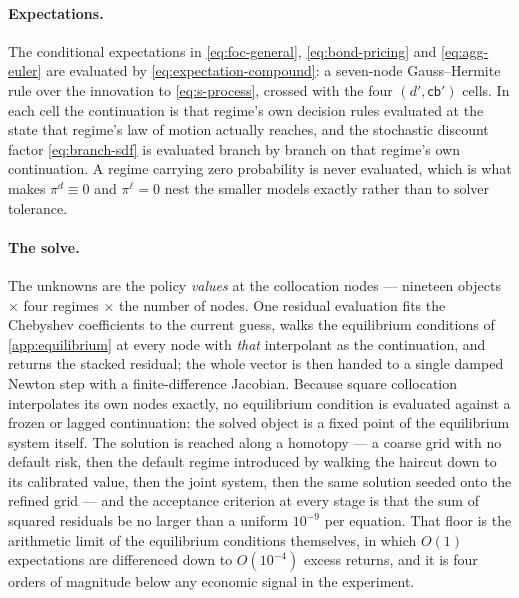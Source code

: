 \paragraph{Expectations.} The conditional expectations in
\eqref{eq:foc-general}, \eqref{eq:bond-pricing} and \eqref{eq:agg-euler} are
evaluated by \eqref{eq:expectation-compound}: a seven-node Gauss--Hermite rule
over the innovation to \eqref{eq:s-process}, crossed with the four
$(d',\mathsf{cb}')$ cells. In each cell the continuation is that regime's own
decision rules evaluated at the state that regime's law of motion actually
reaches, and the stochastic discount factor \eqref{eq:branch-sdf} is evaluated
branch by branch on that regime's own continuation. A regime carrying zero
probability is never evaluated, which is what makes $\pi^{d}\equiv0$ and
$\pi^{\ell}=0$ nest the smaller models exactly rather than to solver tolerance.

\paragraph{The solve.} The unknowns are the policy \emph{values} at the
collocation nodes --- nineteen objects $\times$ four regimes $\times$ the number
of nodes. One residual evaluation fits the Chebyshev coefficients to the current
guess, walks the equilibrium conditions of \cref{app:equilibrium} at every node
with \emph{that} interpolant as the continuation, and returns the stacked
residual; the whole vector is then handed to a single damped Newton step with a
finite-difference Jacobian. Because square collocation interpolates its own
nodes exactly, no equilibrium condition is evaluated against a frozen or lagged
continuation: the solved object is a fixed point of the equilibrium system
itself. The solution is reached along a homotopy --- a coarse grid with no
default risk, then the default regime introduced by walking the haircut down to
its calibrated value, then the joint system, then the same solution seeded onto
the refined grid --- and the acceptance criterion at every stage is that the sum
of squared residuals be no larger than a uniform $10^{-9}$ per equation. That
floor is the arithmetic limit of the equilibrium conditions themselves, in which
$O(1)$ expectations are differenced down to $O(10^{-4})$ excess returns, and it is
four orders of magnitude below any economic signal in the experiment.

